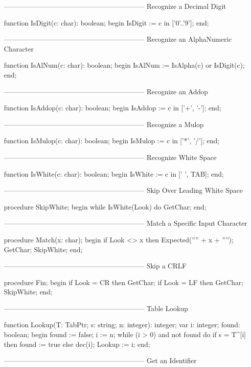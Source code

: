 \documentclass[float=false, crop=false]{standalone}
\begin{document}
\begin{code}
{--------------------------------------------------------------}
{ Recognize a Decimal Digit }

function IsDigit(c: char): boolean;
begin
   IsDigit := c in ['0'..'9'];
end;


{--------------------------------------------------------------}
{ Recognize an AlphaNumeric Character }

function IsAlNum(c: char): boolean;
begin
   IsAlNum := IsAlpha(c) or IsDigit(c);
end;


{--------------------------------------------------------------}
{ Recognize an Addop }

function IsAddop(c: char): boolean;
begin
   IsAddop := c in ['+', '-'];
end;


{--------------------------------------------------------------}
{ Recognize a Mulop }

function IsMulop(c: char): boolean;
begin
   IsMulop := c in ['*', '/'];
end;


{--------------------------------------------------------------}
{ Recognize White Space }

function IsWhite(c: char): boolean;
begin
   IsWhite := c in [' ', TAB];
end;


{--------------------------------------------------------------}
{ Skip Over Leading White Space }

procedure SkipWhite;
begin
   while IsWhite(Look) do
      GetChar;
end;


{--------------------------------------------------------------}
{ Match a Specific Input Character }

procedure Match(x: char);
begin
   if Look <> x then Expected('''' + x + '''');
   GetChar;
   SkipWhite;
end;


{--------------------------------------------------------------}
{ Skip a CRLF }

procedure Fin;
begin
   if Look = CR then GetChar;
   if Look = LF then GetChar;
   SkipWhite;
end;


{--------------------------------------------------------------}
{ Table Lookup }

function Lookup(T: TabPtr; s: string; n: integer): integer;
var i: integer;
    found: boolean;
begin
   found := false;
   i := n;
   while (i > 0) and not found do
      if s = T^[i] then
         found := true
      else
         dec(i);
   Lookup := i;
end;


{--------------------------------------------------------------}
{ Get an Identifier }


\end{code}
\end{document}
